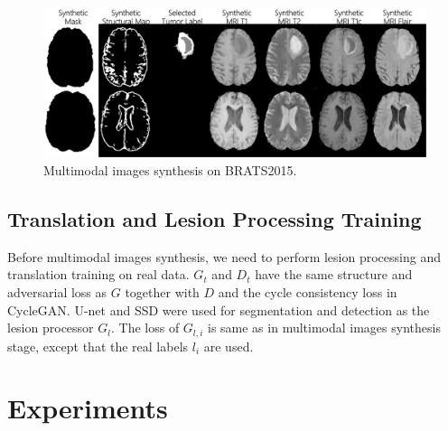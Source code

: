 \documentclass[runningheads]{llncs}
\begin{document}
	\begin{figure}[th]
		\centering
		\includegraphics[width=0.7\linewidth]{figures/F_to_MRI}
		\caption{Multimodal images synthesis on BRATS2015.}
		\label{generated_mri}
	\end{figure}
	\subsection{Translation and Lesion Processing Training}
	Before multimodal images synthesis, we need to perform lesion processing and translation training on real data. $G_t$ and $D_t$ have the same structure and adversarial loss as $G$ together with $D$ and the cycle consistency loss in CycleGAN\cite{6zhu2017unpaired}.
	U-net and SSD\cite{101liu2016ssd:} were used for segmentation and detection as the lesion processor $G_l$. The loss of $G_{l,i}$ is same as in multimodal images synthesis stage, except that the real labels $l_i$ are used.
	\section{Experiments}
\end{document}
